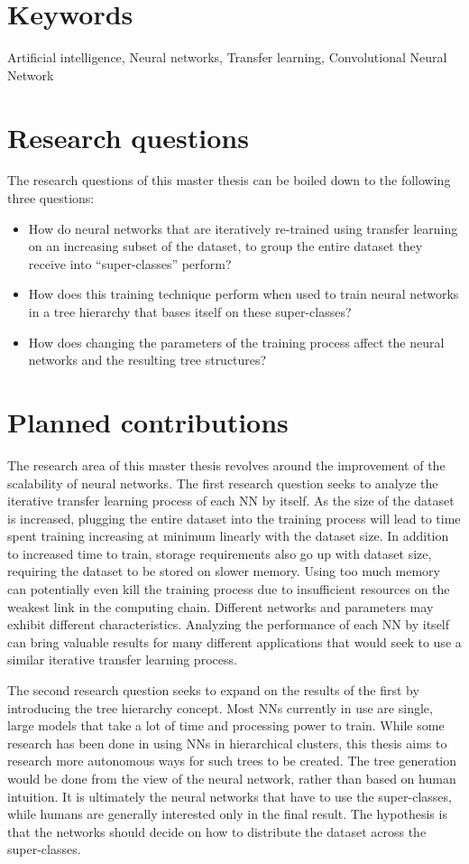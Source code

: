 \section{Keywords}
Artificial intelligence, Neural networks, Transfer learning, Convolutional Neural Network

\section{Research questions}\label{research:questions}
The research questions of this master thesis can be boiled down to the following three questions: 

\begin{itemize}
    \item How do neural networks that are iteratively re-trained using transfer learning on an increasing subset of the dataset, to group the entire dataset they receive into “super-classes” perform? 
    \item How does this training technique perform when used to train neural networks in a tree hierarchy that bases itself on these super-classes?
    \item How does changing the parameters of the training process affect the neural networks and the resulting tree structures?
\end{itemize}{}

\section{Planned contributions}
The research area of this master thesis revolves around the improvement of the scalability of neural networks. 
The first research question seeks to analyze the iterative transfer learning process of each NN by itself. 
As the size of the dataset is increased, plugging the entire dataset into the training process will lead to time spent training increasing at minimum linearly with the dataset size.
In addition to increased time to train, storage requirements also go up with dataset size, requiring the dataset to be stored on slower memory.
Using too much memory can potentially even kill the training process due to insufficient resources on the weakest link in the computing chain.
Different networks and parameters may exhibit different characteristics. 
Analyzing the performance of each NN by itself can bring valuable results for many different applications that would seek to use a similar iterative transfer learning process. 

The second research question seeks to expand on the results of the first by introducing the tree hierarchy concept. 
Most NNs currently in use are single, large models that take a lot of time and processing power to train. 
While some research has been done in using NNs in hierarchical clusters, this thesis aims to research more autonomous ways for such trees to be created.
The tree generation would be done from the view of the neural network, rather than based on human intuition.
It is ultimately the neural networks that have to use the super-classes, while humans are generally interested only in the final result.
The hypothesis is that the networks should decide on how to distribute the dataset across the super-classes.

